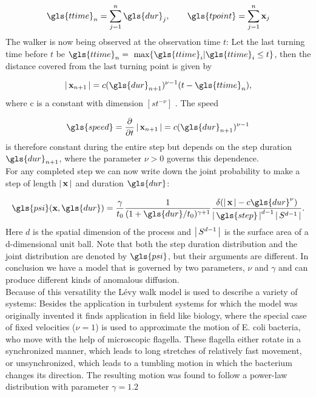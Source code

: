 \begin{align}
\gls{ttime}_n = \sum_{j=1}^n \gls{dur}_j , \qquad \gls{tpoint} = \sum_{j=1}^n \ve{x}_j
\end{align}
%
The walker is now being observed at the observation time $t$: Let the last turning time before $t$ be $\gls{ttime}_n = \text{ max} \{\gls{ttime}_i | \gls{ttime}_i \leq t \}$, then the distance covered from the last turning point is given by

\begin{align}
\abs{\ve{x}_{n+1}} = c (\gls{dur}_{n+1})^{\nu-1} (t-\gls{ttime}_n) ,
\end{align}
%
where c is a constant with dimension $ [ s t^{-\nu} ] $ . The speed 

\begin{align}
\gls{speed} = \pder{}{t} \abs{\ve{x}_{n+1}} = c (\gls{dur}_{n+1})^{\nu-1}
\end{align}
%
is therefore constant during the entire step but depends on the step duration $\gls{dur}_{n+1}$, where the parameter $\nu>0$ governs this dependence. \\
For any completed step we can now write down the joint probability to make a step of length $\left|\,\mathbf{ x }\,\right|$ and duration $\gls{dur}$:

\begin{align}
\gls{psi}(\ve{x}, \gls{dur} ) = \frac{\gamma}{t_0} \frac{1}{(1+\gls{dur}/t_0)^{\gamma+1}}  \frac{\delta(\abs{\ve{x}} - c \gls{dur}^{\nu}) }{\abs{\gls{step}}^{d-1} \abs{S^{d-1}}}  \label{eqn:defPsiXT}.
\end{align}
%
Here $d$ is the spatial dimension of the process and $\left|\,S^{d-1}\,\right|$ is the surface area of a d-dimensional unit ball. Note that both the step duration distribution and the joint distribution are denoted by $\gls{psi}$, but their arguments are different. In conclusion we have a model that is governed by two parameters, $\nu$ and $\gamma$ and can produce different kinds of anomalous diffusion.\\

Because of this versatility the L\'evy walk model is used to describe a variety of systems: Besides the application in turbulent systems for which the model was originally invented it finds application in field like biology, where  the special case of fixed velocities ($\nu=1$) is used to approximate the motion of E. coli bacteria, who move with the help of microscopic flagella. These flagella either rotate in a synchronized manner, which leads to long stretches of relatively fast movement, or unsynchronized, which leads to a tumbling motion in which the bacterium changes its direction. The resulting motion was found to follow a power-law distribution with parameter $\gamma = 1.2$ \cite{korobkova2004}

